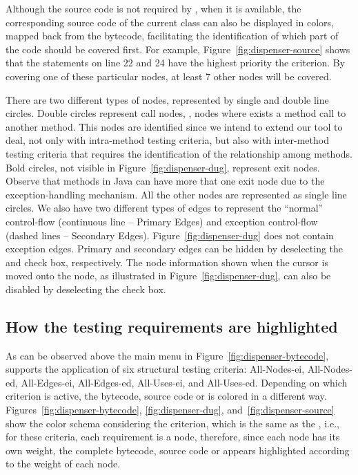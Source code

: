Although the source code is not required by \toolname, when it is
available, the corresponding source code of the current class can
also be displayed in colors, mapped back from the bytecode,
facilitating the identification of which part of the code should
be covered first. For example, Figure~\ref{fig:dispenser-source}
shows that the statements on line 22 and 24 have the highest priority \wrt
the  criterion. By covering one of these particular
nodes, at least 7 other nodes will be covered.







There are two different types of nodes,
represented by single and double line circles. 
Double circles represent call nodes,
\ie, nodes where exists a method call to another method. This
nodes are identified since we intend to extend our tool to deal,
not only with intra-method testing criteria, but also with
inter-method testing criteria that requires the identification of
the relationship among methods. Bold circles, not visible in
Figure~\ref{fig:dispenser-dug}, represent exit nodes. Observe that
methods in Java can have more that one exit node due to the
exception-handling mechanism. All the other nodes are represented
as single line circles. We also have two different types of edges
to represent the ``normal'' control-flow (continuous line --
Primary Edges) and exception control-flow (dashed lines --
Secondary Edges). Figure~\ref{fig:dispenser-dug} does not contain
exception edges. Primary and secondary edges can be hidden by
deselecting the  and 
check box, respectively. The node information shown when the
cursor is moved onto the node, as illustrated in
Figure~\ref{fig:dispenser-dug}, can also be disabled by
deselecting the  check box.

\subsection{How the testing requirements are highlighted}

As can be observed above the main menu in
Figure~\ref{fig:dispenser-bytecode}, \toolname supports the
application of six structural testing criteria:
All-Nodes-ei, All-Nodes-ed,
All-Edges-ei, All-Edges-ed, All-Uses-ei, and All-Uses-ed.
Depending on which criterion is active, the bytecode, source code
or \DUG is colored in a different way.
Figures~\ref{fig:dispenser-bytecode}, \ref{fig:dispenser-dug},
and~\ref{fig:dispenser-source} show the color schema considering
the  criterion, which is the same as the
, i.e., for these criteria, each requirement is
a node, therefore, since each node has its own weight, the
complete bytecode, source code or \DUG appears highlighted
according to the weight of each node.

